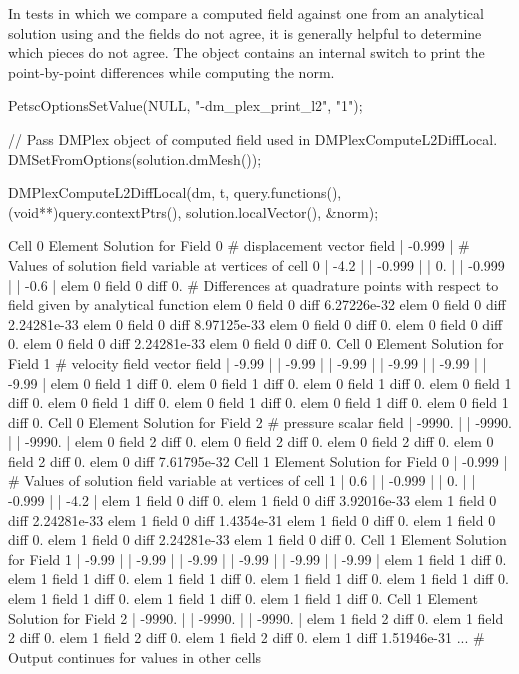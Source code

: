 In tests in which we compare a computed field against one from an analytical solution using
 and the fields do not agree, it is generally helpful to determine which pieces do
not agree. The  object contains an internal switch to print the point-by-point differences while computing
the norm.

\begin{cplusplus}
PetscOptionsSetValue(NULL, "-dm_plex_print_l2", "1");

// Pass DMPlex object of computed field used in DMPlexComputeL2DiffLocal.
DMSetFromOptions(solution.dmMesh());

DMPlexComputeL2DiffLocal(dm, t, query.functions(), (void**)query.contextPtrs(), solution.localVector(), &norm);
\end{cplusplus}

\begin{shell}
Cell 0 Element Solution for Field 0 # displacement vector field
  | -0.999 | # Values of solution field variable at vertices of cell 0
  | -4.2 |
  | -0.999 |
  | 0. |
  | -0.999 |
  | -0.6 |
    elem 0 field 0 diff 0.  # Differences at quadrature points with respect to field given by analytical function
    elem 0 field 0 diff 6.27226e-32
    elem 0 field 0 diff 2.24281e-33
    elem 0 field 0 diff 8.97125e-33
    elem 0 field 0 diff 0.
    elem 0 field 0 diff 0.
    elem 0 field 0 diff 2.24281e-33
    elem 0 field 0 diff 0.
Cell 0 Element Solution for Field 1 # velocity field vector field
  | -9.99 |
  | -9.99 |
  | -9.99 |
  | -9.99 |
  | -9.99 |
  | -9.99 |
    elem 0 field 1 diff 0.
    elem 0 field 1 diff 0.
    elem 0 field 1 diff 0.
    elem 0 field 1 diff 0.
    elem 0 field 1 diff 0.
    elem 0 field 1 diff 0.
    elem 0 field 1 diff 0.
    elem 0 field 1 diff 0.
Cell 0 Element Solution for Field 2 # pressure scalar field
  | -9990. |
  | -9990. |
  | -9990. |
    elem 0 field 2 diff 0.
    elem 0 field 2 diff 0.
    elem 0 field 2 diff 0.
    elem 0 field 2 diff 0.
  elem 0 diff 7.61795e-32
Cell 1 Element Solution for Field 0
  | -0.999 | # Values of solution field variable at vertices of cell 1
  | 0.6 |
  | -0.999 |
  | 0. |
  | -0.999 |
  | -4.2 |
    elem 1 field 0 diff 0.
    elem 1 field 0 diff 3.92016e-33
    elem 1 field 0 diff 2.24281e-33
    elem 1 field 0 diff 1.4354e-31
    elem 1 field 0 diff 0.
    elem 1 field 0 diff 0.
    elem 1 field 0 diff 2.24281e-33
    elem 1 field 0 diff 0.
Cell 1 Element Solution for Field 1
  | -9.99 |
  | -9.99 |
  | -9.99 |
  | -9.99 |
  | -9.99 |
  | -9.99 |
    elem 1 field 1 diff 0.
    elem 1 field 1 diff 0.
    elem 1 field 1 diff 0.
    elem 1 field 1 diff 0.
    elem 1 field 1 diff 0.
    elem 1 field 1 diff 0.
    elem 1 field 1 diff 0.
    elem 1 field 1 diff 0.
Cell 1 Element Solution for Field 2
  | -9990. |
  | -9990. |
  | -9990. |
    elem 1 field 2 diff 0.
    elem 1 field 2 diff 0.
    elem 1 field 2 diff 0.
    elem 1 field 2 diff 0.
  elem 1 diff 1.51946e-31
... # Output continues for values in other cells
\end{shell}



